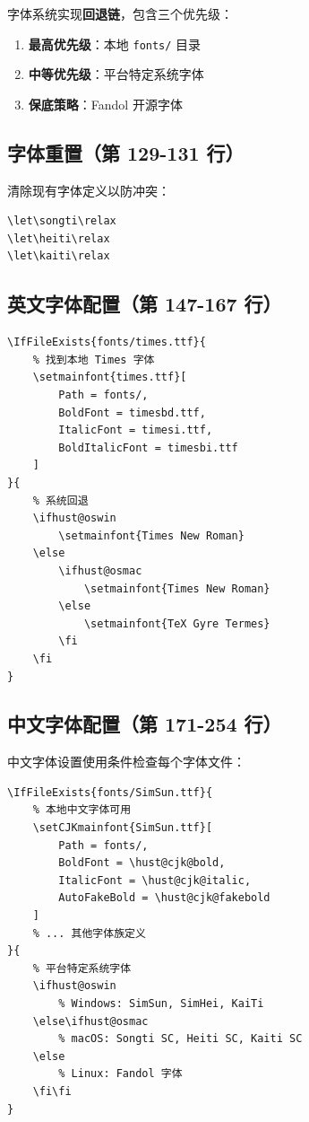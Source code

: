 \documentclass[linux]{hustreport}
\begin{document}
字体系统实现\textbf{回退链}，包含三个优先级：

\begin{enumerate}
    \item \textbf{最高优先级}：本地 \texttt{fonts/} 目录
    \item \textbf{中等优先级}：平台特定系统字体
    \item \textbf{保底策略}：Fandol 开源字体
\end{enumerate}

\subsection{字体重置（第 129-131 行）}

清除现有字体定义以防冲突：

\begin{verbatim}
\let\songti\relax
\let\heiti\relax
\let\kaiti\relax
\end{verbatim}

\subsection{英文字体配置（第 147-167 行）}

\begin{verbatim}
\IfFileExists{fonts/times.ttf}{
    % 找到本地 Times 字体
    \setmainfont{times.ttf}[
        Path = fonts/,
        BoldFont = timesbd.ttf,
        ItalicFont = timesi.ttf,
        BoldItalicFont = timesbi.ttf
    ]
}{
    % 系统回退
    \ifhust@oswin
        \setmainfont{Times New Roman}
    \else
        \ifhust@osmac
            \setmainfont{Times New Roman}
        \else
            \setmainfont{TeX Gyre Termes}
        \fi
    \fi
}
\end{verbatim}

\subsection{中文字体配置（第 171-254 行）}

中文字体设置使用条件检查每个字体文件：

\begin{verbatim}
\IfFileExists{fonts/SimSun.ttf}{
    % 本地中文字体可用
    \setCJKmainfont{SimSun.ttf}[
        Path = fonts/,
        BoldFont = \hust@cjk@bold,
        ItalicFont = \hust@cjk@italic,
        AutoFakeBold = \hust@cjk@fakebold
    ]
    % ... 其他字体族定义
}{
    % 平台特定系统字体
    \ifhust@oswin
        % Windows: SimSun, SimHei, KaiTi
    \else\ifhust@osmac
        % macOS: Songti SC, Heiti SC, Kaiti SC
    \else
        % Linux: Fandol 字体
    \fi\fi
}
\end{verbatim}
\end{document}
